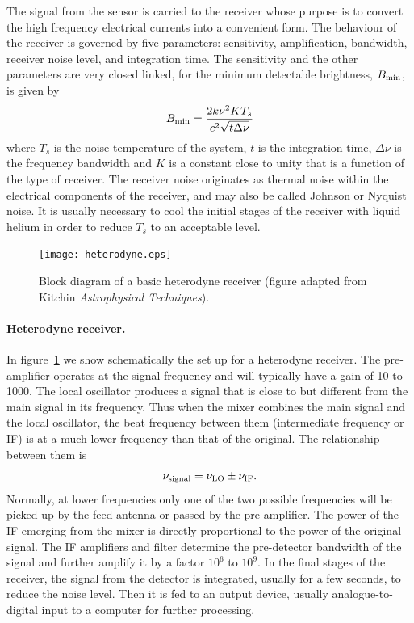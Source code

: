The signal from the sensor is carried to the receiver whose purpose is 
to convert the high frequency electrical currents into a convenient form.
The behaviour of the receiver is governed by five parameters: sensitivity,
amplification, bandwidth, receiver noise level, and integration time. The
sensitivity and the other parameters are very closed linked, for the minimum
detectable brightness, $B_{\rm min}$, is given by
\[
B_{\rm min}={2k\nu^2KT_s\over c^2\sqrt{t\Delta\nu}}
\]
where $T_s$ is the noise temperature of the system, $t$ is the integration 
time, $\Delta\nu$ is the frequency bandwidth and $K$ is a constant close to 
unity that is a function of the type of receiver. The receiver noise originates
as thermal noise within the electrical components of the receiver, and may also
be called Johnson or Nyquist noise. It is usually necessary to cool the initial
stages of the receiver with liquid helium in order to reduce $T_s$ to an 
acceptable level.


\begin{figure}[h]
  \centering
	\texttt{[image: heterodyne.eps]}
  \caption{Block diagram of a basic heterodyne receiver (figure adapted from Kitchin {\it
Astrophysical Techniques}).}
  \label{fig:heterodyne}
\end{figure}


\paragraph{Heterodyne receiver.}  
In figure~\ref{fig:heterodyne} we show schematically the set up for a heterodyne receiver. The
pre-amplifier operates at the signal frequency and will typically have a gain of 10 to 1000. The
local oscillator produces a signal that is close to but different from the main signal in its 
frequency. Thus when the mixer combines the main signal and the local oscillator, the beat 
frequency between them (intermediate frequency or IF) is at a much lower frequency than that of
the original. The relationship between them is 
\[
\nu_{\rm signal}=\nu_{\rm LO}\pm\nu_{\rm IF}.
\]
Normally, at lower frequencies only one of the two possible frequencies will be picked up by 
the feed antenna or passed by the pre-amplifier. The power of the IF emerging from the mixer
is directly proportional to the power of the original signal. The IF amplifiers and filter 
determine the pre-detector bandwidth of the signal and further amplify it by a factor $10^6$ to
$10^9$. In the final stages of the receiver, the signal from the detector is integrated, usually for
a few seconds, to reduce the noise level. Then it is fed to an output device, usually 
analogue-to-digital input to a computer for further processing.


